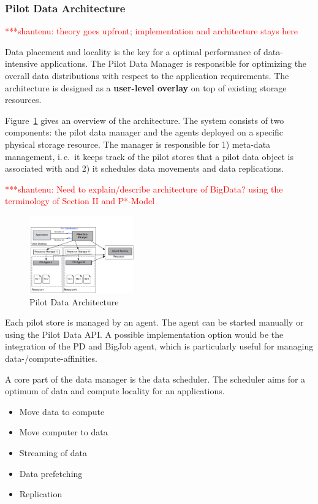 \documentclass[conference,final]{IEEEtran}
\newcommand{\jhanote}[1]{ {\textcolor{red} { ***shantenu: #1 }}}
\newcommand{\jhanote}[1]{}
\begin{document}
\subsubsection{Pilot Data Architecture}

\jhanote{theory goes upfront; implementation and architecture stays
  here}

Data placement and locality is the key for a optimal performance of
data-intensive applications. The Pilot Data Manager is responsible for
optimizing the overall data distributions with respect to the
application requirements. The architecture is designed as a
\textbf{user-level overlay} on top of existing storage resources.

Figure~\ref{fig:figures_distributed_pilot_job} gives an overview of the
architecture. The system consists of two components: the pilot data manager and
the agents deployed on a specific physical storage resource. The manager is
responsible for 1) meta-data management, i.\,e.\ it keeps track of the pilot
stores that a pilot data object is associated with and 2) it schedules data
movements and data replications.

\jhanote{Need to explain/describe architecture of BigData? using the
  terminology of Section II and P*-Model}

\begin{figure}[htbp]
    \centering
        \includegraphics[width=0.4\textwidth]{figures/pilot-data-manager.pdf}
    \caption{Pilot Data Architecture}
    \label{fig:figures_distributed_pilot_job}
\end{figure}

Each pilot store is managed by an agent. The agent can be started manually or 
using the Pilot Data API. A possible implementation option would be the 
integration of the PD and BigJob agent, which is particularly useful for 
managing data-/compute-affinities.

A core part of the data manager is the data scheduler. The scheduler aims for a 
optimum of data and compute locality for an applications.
\begin{itemize}
	\item Move data to compute
	\item Move computer to data
	\item Streaming of data
	\item Data prefetching 
	\item Replication
\end{itemize}
\end{document}
